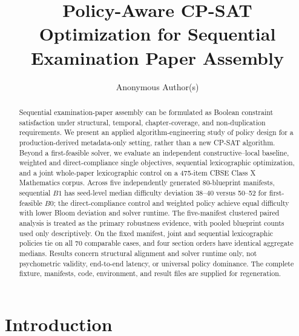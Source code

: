 \documentclass[runningheads]{llncs}
\begin{document}
\title{Policy-Aware CP-SAT Optimization for Sequential Examination Paper Assembly}

\author{Anonymous Author(s)}

\maketitle

\begin{abstract}
Sequential examination-paper assembly can be formulated as Boolean constraint satisfaction under structural, temporal, chapter-coverage, and non-duplication requirements. We present an applied algorithm-engineering study of policy design for a production-derived metadata-only setting, rather than a new CP-SAT algorithm. Beyond a first-feasible solver, we evaluate an independent constructive--local baseline, weighted and direct-compliance single objectives, sequential lexicographic optimization, and a joint whole-paper lexicographic control on a 475-item CBSE Class X Mathematics corpus. Across five independently generated 80-blueprint manifests, sequential $B1$ has seed-level median difficulty deviation 38--40 versus 50--52 for first-feasible $B0$; the direct-compliance control and weighted policy achieve equal difficulty with lower Bloom deviation and solver runtime. The five-manifest clustered paired analysis is treated as the primary robustness evidence, with pooled blueprint counts used only descriptively. On the fixed manifest, joint and sequential lexicographic policies tie on all 70 comparable cases, and four section orders have identical aggregate medians. Results concern structural alignment and solver runtime only, not psychometric validity, end-to-end latency, or universal policy dominance. The complete fixture, manifests, code, environment, and result files are supplied for regeneration.
\end{abstract}

\section{Introduction}
\label{sec:intro}
\end{document}
